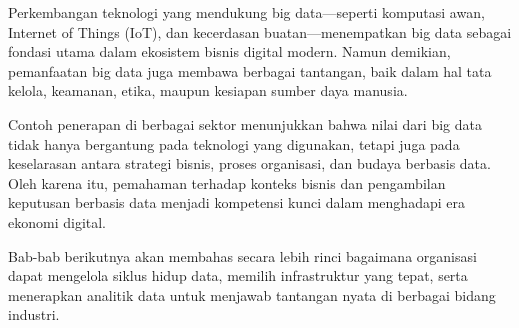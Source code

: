 Perkembangan teknologi yang mendukung big data—seperti komputasi awan, Internet of Things (IoT), dan kecerdasan buatan—menempatkan big data sebagai fondasi utama dalam ekosistem bisnis digital modern. Namun demikian, pemanfaatan big data juga membawa berbagai tantangan, baik dalam hal tata kelola, keamanan, etika, maupun kesiapan sumber daya manusia.

Contoh penerapan di berbagai sektor menunjukkan bahwa nilai dari big data tidak hanya bergantung pada teknologi yang digunakan, tetapi juga pada keselarasan antara strategi bisnis, proses organisasi, dan budaya berbasis data. Oleh karena itu, pemahaman terhadap konteks bisnis dan pengambilan keputusan berbasis data menjadi kompetensi kunci dalam menghadapi era ekonomi digital.

Bab-bab berikutnya akan membahas secara lebih rinci bagaimana organisasi dapat mengelola siklus hidup data, memilih infrastruktur yang tepat, serta menerapkan analitik data untuk menjawab tantangan nyata di berbagai bidang industri.
